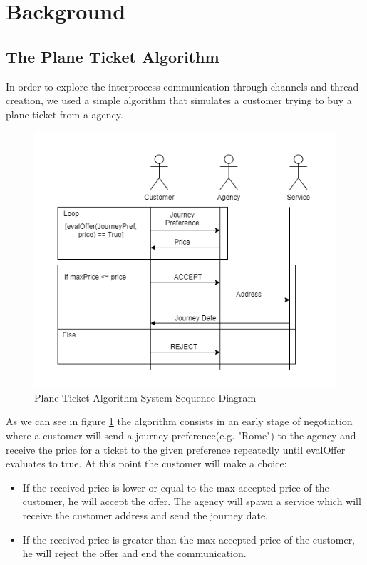 \documentclass[runningheads]{llncs}
\begin{document}
\section{Background}
\subsection{The Plane Ticket Algorithm}
In order to explore the interprocess communication through channels and thread creation, we used a simple algorithm that simulates a customer trying to buy a plane ticket from a agency.
\begin{figure}[H]
\centering
\includegraphics[scale=0.4]{Algorithm.png}
\caption{Plane Ticket Algorithm System Sequence Diagram}
\label{ssd}
\end{figure}
As we can see in figure \ref{ssd} the algorithm consists in an early stage of negotiation where a customer will send a journey preference(e.g. "Rome") to the agency and receive the price for a ticket to the given preference repeatedly until evalOffer evaluates to true.
At this point the customer will make a choice:
\begin{itemize}
\item If the received price is lower or equal to the max accepted price of the customer, he will accept the offer.
The agency will spawn a service which will receive the customer address and send the journey date.
\item If the received price is greater than the max accepted price of the customer, he will reject the offer and end the communication.
\end{itemize}
\end{document}
